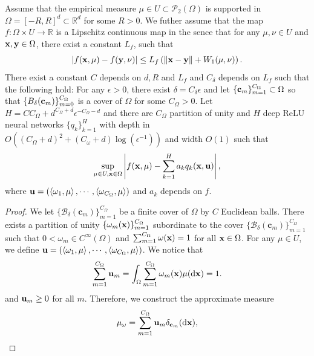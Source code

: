 \documentclass[aspectratio=169]{beamer}
\begin{document}
\begin{frame}\small{
\begin{theorem}
    Assume that the empirical measure $\mu\in U \subset \mathcal P_2(\Omega)$ is supported in $\Omega=[-R,R]^d\subset \mathbb R^d$ for some $R>0$. We futher assume that the map $f:\Omega \times U \to \mathbb R $ is a Lipschitz continuous map in the sence that for any $\mu,\nu\in U $ and $\mathbf{x},\mathbf{y}\in \Omega$, there exist a constant $L_f$, such that 
    \[
    |f(\mathbf{x},\mu) -f(\mathbf{y},\nu) | \leq L_f \left(\|\mathbf{x}-\mathbf{y}\| +W_1(\mu,\nu)\right).
    \]
    There exist a constant $C$ depends on $d, R $ and $L_f$  and $C_\delta$ depends on $ L_f$ such that the following hold:
    For any $\epsilon>0$, there exist $\delta = C_\delta \epsilon $ and let $\{\mathbf{c}_m\}_{m=1}^{C_\Omega}\subset\Omega$ so that $\{B_\delta (\mathbf{c}_m)\}_{m=0}^{C_\Omega}$ is a cover of $\Omega$ for some $C_\Omega >0$. Let $H=CC_\Omega + d^{C_\Omega +d }\epsilon^{-C_\Omega -d}$ and there are $C_\Omega$ partition of unity and  $H$ deep ReLU neural networks $\{q_k\}_{k=1}^H$ with depth in $O( (C_\Omega+d)^2 + (C_\omega +d)\log(\epsilon^{-1}))$ and width $O(1)$ such that 
    \[
    \sup_{\mu\in U ,\mathbf{x}\in \Omega }\left|f(\mathbf{x},\mu)- \sum_{k=1}^H a_k q_k(\mathbf{x},\mathbf{u}) \right|,
    \]
    where 
    \(\mathbf{u}=\left(\left\langle \omega_1,\mu\right\rangle, \cdots , \left\langle \omega_{C_\Omega},\mu\right\rangle\right)
    \) and $a_k$ depends on $f$.
\end{theorem}
    }
\end{frame}
\begin{frame}
\begin{proof}
    We let \(\{\mathcal B_\delta (\mathbf c_m)\}_{m=1}^{C_\Omega}\) be a finite cover of \(\Omega\) by $C$ Euclidean balls. There exists a partition of unity $\{\omega_m(\mathbf{x})\}_{m=1}^{C_\Omega}$ subordinate to the cover \(\{\mathcal B_\delta (\mathbf c_m)\}_{m=1}^{C_\Omega}\) such that $0< \omega_m\in C^\infty (\Omega)$ and $\sum_{m=1}^{C_\Omega}\omega(\mathbf{x})=1$ for all $\mathbf{x}\in \Omega$.
    For any $\mu\in U$, we define 
   \(\mathbf{u}=\left(\left\langle \omega_1,\mu\right\rangle, \cdots , \left\langle \omega_{C_\Omega},\mu\right\rangle\right)
    \). We notice that 
    \[\sum_{m=1}^{C_\Omega} \mathbf{u}_m = \int_\Omega \sum_{m=1}^{C_\Omega} \omega_m(\mathbf{x})\mu(\mathrm{d} \mathbf{x})=1.\]
    and $\mathbf{u}_m\geq0$ for all $m$.
    Therefore, we construct the approximate measure 
    \[
    \mu_\omega = \sum_{m=1}^{C_\Omega} \mathbf{u}_m \delta_{\mathbf{c}_m}(\mathrm{d} \mathbf{x}),
    \]
    \end{proof}
\end{frame}
\end{document}
